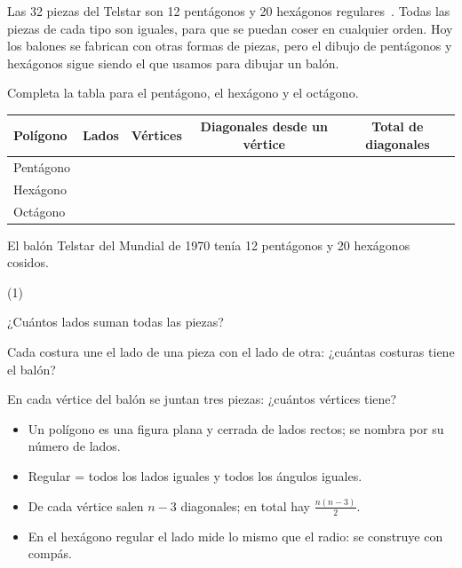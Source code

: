 \documentclass[11pt]{article}
\begin{document}
\begin{aplicacion}
Las 32 piezas del Telstar son 12 pentágonos y 20 hexágonos regulares~\cite{adidas}. Todas las
piezas de cada tipo son iguales, para que se puedan coser en cualquier orden. Hoy los balones se
fabrican con otras formas de piezas, pero el dibujo de pentágonos y hexágonos sigue siendo el
que usamos para dibujar un balón.
\end{aplicacion}

\begin{preguntas}
\pregunta Completa la tabla para el pentágono, el hexágono y el octágono.
\begin{center}
\renewcommand{\arraystretch}{1.4}
\begin{tabular}{|l|c|c|c|c|}\hline
Polígono & Lados & Vértices & Diagonales desde un vértice & Total de diagonales\\\hline
Pentágono & & & & \\\hline
Hexágono & & & & \\\hline
Octágono & & & & \\\hline
\end{tabular}
\end{center}
\pregunta El balón Telstar del Mundial de 1970 tenía 12 pentágonos y 20 hexágonos cosidos.
\begin{opciones*}(1)
  \item ¿Cuántos lados suman todas las piezas?
  \item Cada costura une el lado de una pieza con el lado de otra: ¿cuántas costuras tiene el balón?
  \item En cada vértice del balón se juntan tres piezas: ¿cuántos vértices tiene?
\end{opciones*}
\espacio{3.5cm}
\end{preguntas}

\begin{resumen}
\begin{itemize}
  \item Un polígono es una figura plana y cerrada de lados rectos; se nombra por su número de lados.
  \item Regular = todos los lados iguales y todos los ángulos iguales.
  \item De cada vértice salen $n - 3$ diagonales; en total hay $\frac{n(n-3)}{2}$.
  \item En el hexágono regular el lado mide lo mismo que el radio: se construye con compás.
\end{itemize}
\end{resumen}
\end{document}
